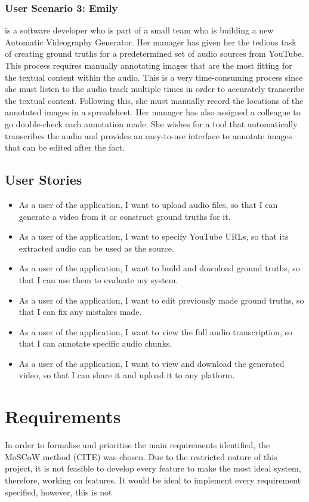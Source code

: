 \documentclass{l4proj}
\begin{document}
\subsubsection{User Scenario 3: Emily} is a software developer who is part of a small team who is building a new Automatic Videography Generator. Her manager has given her the tedious task of creating ground truths for a predetermined set of audio sources from YouTube. This process requires manually annotating images that are the most fitting for the textual content within the audio. This is a very time-consuming process since she must listen to the audio track multiple times in order to accurately transcribe the textual content. Following this, she must manually record the locations of the annotated images in a spreadsheet. Her manager has also assigned a colleague to go double-check each annotation made. She wishes for a tool that automatically transcribes the audio and provides an easy-to-use interface to annotate images that can be edited after the fact. 


\subsection{User Stories}
\begin{itemize}
    \item As a user of the application, I want to upload audio files, so that I can generate a video from it or construct ground truths for it.
    \item As a user of the application, I want to specify YouTube URLs, so that its  extracted audio can be used as the source.
    \item As a user of the application, I want to build and download ground truths, so that I can use them to evaluate my system.
    \item As a user of the application, I want to edit previously made ground truths, so that I can fix any mistakes made.
    \item As a user of the application, I want to view the full audio transcription, so that I can annotate specific audio chunks.
    \item As a user of the application, I want to view and download the generated video, so that I can share it and upload it to any platform.
\end{itemize}


\section{Requirements}
In order to formalise and prioritise the main requirements identified, the MoSCoW method (CITE) was chosen. Due to the restricted nature of this project, it is not feasible to develop every feature to make the most ideal system, therefore, working on features. 
It would be ideal to implement every requirement specified, however, this is not 
\end{document}
